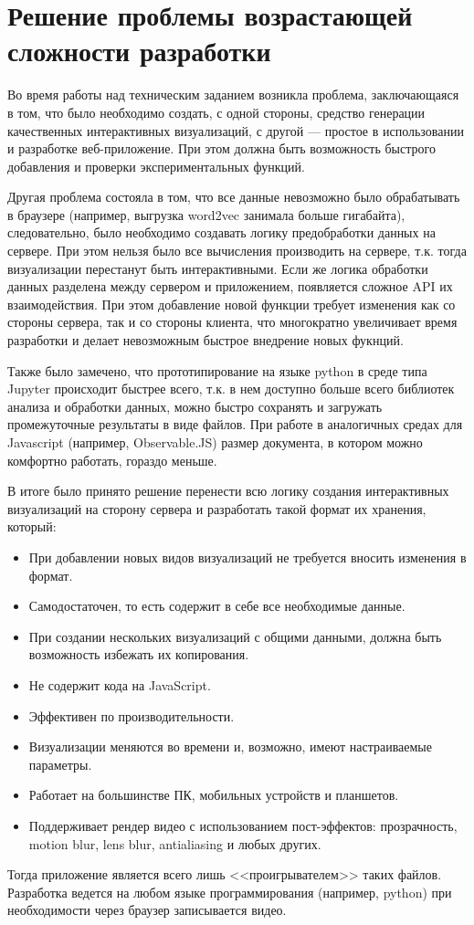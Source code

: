 \section{Решение проблемы возрастающей сложности разработки}

Во время работы над техническим заданием возникла проблема, заключающаяся в том, что было необходимо создать, с одной стороны, средство генерации качественных интерактивных визуализаций, с другой --- простое в использовании и разработке веб-приложение. При этом должна быть возможность быстрого добавления и проверки экспериментальных функций.

Другая проблема состояла в том, что все данные невозможно было обрабатывать в браузере (например, выгрузка word2vec занимала больше гигабайта), следовательно, было необходимо создавать логику предобработки данных на сервере. При этом нельзя было все вычисления производить на сервере, т.к. тогда визуализации перестанут быть интерактивными. Если же логика обработки данных разделена между сервером и приложением, появляется сложное API их взаимодействия. При этом добавление новой функции требует изменения как со стороны сервера, так и со стороны клиента, что многократно увеличивает время разработки и делает невозможным быстрое внедрение новых фукнций.

Также было замечено, что прототипирование на языке python в среде типа Jupyter происходит быстрее всего, т.к. в нем доступно больше всего библиотек анализа и обработки данных, можно быстро сохранять и загружать промежуточные результаты в виде файлов. При работе в аналогичных средах для Javascript (например, Observable.JS) размер документа, в котором можно комфортно работать, гораздо меньше.

В итоге было принято решение перенести всю логику создания интерактивных визуализаций на сторону сервера и разработать такой формат их хранения, который:
\begin{itemize}
\item При добавлении новых видов визуализаций не требуется вносить изменения в формат.
\item Самодостаточен, то есть содержит в себе все необходимые данные.
\item При создании нескольких визуализаций с общими данными, должна быть возможность избежать их копирования.
\item Не содержит кода на JavaScript.
\item Эффективен по производительности.
\item Визуализации меняются во времени и, возможно, имеют настраиваемые параметры.
\item Работает на большинстве ПК, мобильных устройств и планшетов.
\item Поддерживает рендер видео с использованием пост-эффектов: прозрачность, motion blur, lens blur, antialiasing и любых других.
\end{itemize}
Тогда приложение является всего лишь <<проигрывателем>> таких файлов. Разработка ведется на любом языке программирования (например, python) при необходимости через браузер записывается видео.

